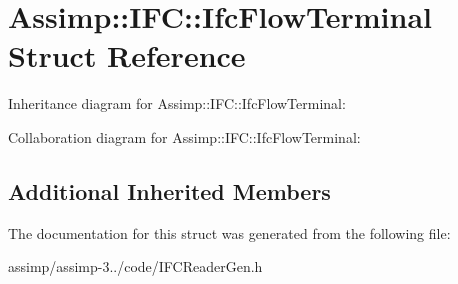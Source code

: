 \hypertarget{struct_assimp_1_1_i_f_c_1_1_ifc_flow_terminal}{\section{Assimp\+:\+:I\+F\+C\+:\+:Ifc\+Flow\+Terminal Struct Reference}
\label{struct_assimp_1_1_i_f_c_1_1_ifc_flow_terminal}
}


Inheritance diagram for Assimp\+:\+:I\+F\+C\+:\+:Ifc\+Flow\+Terminal\+:


Collaboration diagram for Assimp\+:\+:I\+F\+C\+:\+:Ifc\+Flow\+Terminal\+:
\subsection*{Additional Inherited Members}


The documentation for this struct was generated from the following file\+:\begin{DoxyCompactItemize}
\item 
assimp/assimp-\/3../code/I\+F\+C\+Reader\+Gen.\+h\end{DoxyCompactItemize}
